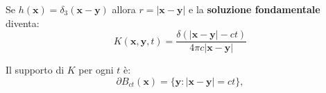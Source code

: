 \documentclass[10pt,a4paper,twoside,openright]{book}
\newcommand{\x}{\mathbf{x}}
\newcommand{\y}{\mathbf{y}}
\begin{document}
Se $\displaystyle h(\x) =\delta _{3}(\x -\y)$ allora $\displaystyle r=| \x -\y| $ e la \textbf{soluzione fondamentale} diventa:
\begin{equation}
	\boxed{K(\x ,\y ,t) =\frac{\delta (| \x -\y| -ct)}{4\pi c| \x -\y| }}
\end{equation}
\begin{oss}
	Il supporto di $K$ per ogni $t$ è:
	\begin{equation}
		\partial B_{ct}(\x) =\{\y :| \x -\y| =ct\} ,
	\end{equation}


	\begin{figure}[H]
		\centering




	\begin{tikzpicture}[x=0.75pt,y=0.75pt,yscale=-1,xscale=1]


\end{tikzpicture}
\end{figure}
\end{oss}
\end{document}
